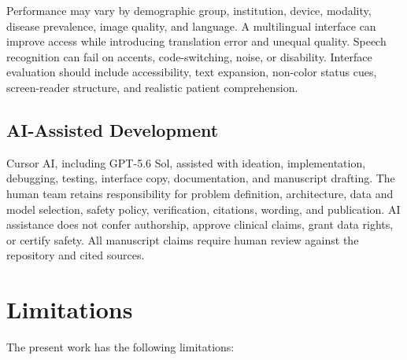 \documentclass[conference]{IEEEtran}
\begin{document}
Performance may vary by demographic group, institution, device, modality, disease prevalence, image quality, and language. A multilingual interface can improve access while introducing translation error and unequal quality. Speech recognition can fail on accents, code-switching, noise, or disability. Interface evaluation should include accessibility, text expansion, non-color status cues, screen-reader structure, and realistic patient comprehension.

\subsection{AI-Assisted Development}

Cursor AI, including GPT-5.6 Sol, assisted with ideation, implementation, debugging, testing, interface copy, documentation, and manuscript drafting. The human team retains responsibility for problem definition, architecture, data and model selection, safety policy, verification, citations, wording, and publication. AI assistance does not confer authorship, approve clinical claims, grant data rights, or certify safety. All manuscript claims require human review against the repository and cited sources.

\section{Limitations}

The present work has the following limitations:
\end{document}

